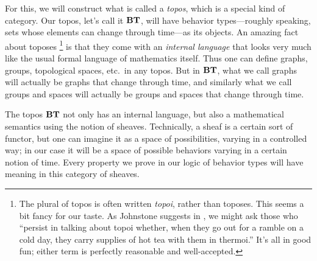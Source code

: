 \documentclass[7Sketches]{subfiles}
\begin{document}
For this, we will construct what is called a \emph{topos}, which is a special kind of category. Our topos, let's call it $\mathbf{BT}$, will have behavior types---roughly speaking, sets whose elements can change through time---as its objects. An amazing fact about toposes%
\footnote{The plural of topos is often written \emph{topoi}, rather than toposes. This seems a bit fancy for our taste. As Johnstone suggests in \cite{Johnstone:1977a}, we might ask those who ``persist in talking about topoi whether, when they go out for a ramble on a cold day, they carry supplies of hot tea with them in thermoi.'' It's all in good fun; either term is perfectly reasonable and well-accepted.%
}
is that they come with an \emph{internal language} that looks very much like the
usual formal language of mathematics itself. Thus one can define graphs, groups,
topological spaces, etc.\ in any topos. But in $\mathbf{BT}$, what we call graphs
will actually be graphs that change through time, and similarly what we call
groups and spaces will actually be groups and spaces that change through time.
%

The topos $\mathbf{BT}$ not only has an internal language, but also a
mathematical semantics using the notion of sheaves. Technically, a sheaf is a
certain sort of functor, but one can imagine it as a space of possibilities, varying in a controlled way; in our case it will be a space of possible behaviors varying in a certain notion of time. Every property we prove in our logic of
behavior types will have meaning in this category of sheaves.%
%
%
\end{document}

